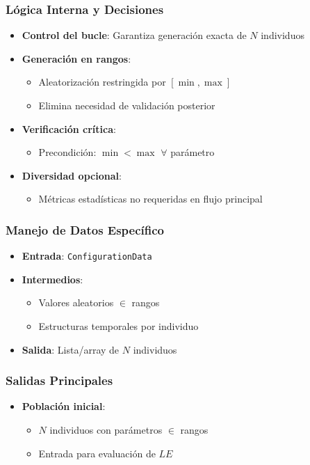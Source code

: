 \subsubsection{Lógica Interna y Decisiones}
\begin{itemize}
    \item \textbf{Control del bucle}: Garantiza generación exacta de $N$ individuos
    \item \textbf{Generación en rangos}:
    \begin{itemize}
        \item Aleatorización restringida por $[\min, \max]$
        \item Elimina necesidad de validación posterior
    \end{itemize}
    \item \textbf{Verificación crítica}:
    \begin{itemize}
        \item Precondición: $\min < \max$ $\forall$ parámetro
    \end{itemize}
    \item \textbf{Diversidad opcional}:
    \begin{itemize}
        \item Métricas estadísticas no requeridas en flujo principal
    \end{itemize}
\end{itemize}

\subsubsection{Manejo de Datos Específico}
\begin{itemize}
    \item \textbf{Entrada}: \texttt{ConfigurationData}
    \item \textbf{Intermedios}:
    \begin{itemize}
        \item Valores aleatorios $\in$ rangos
        \item Estructuras temporales por individuo
    \end{itemize}
    \item \textbf{Salida}: Lista/array de $N$ individuos
\end{itemize}

\subsubsection{Salidas Principales}
\begin{itemize}
    \item \textbf{Población inicial}:
    \begin{itemize}
        \item $N$ individuos con parámetros $\in$ rangos
        \item Entrada para evaluación de $LE$
    \end{itemize}
\end{itemize}

